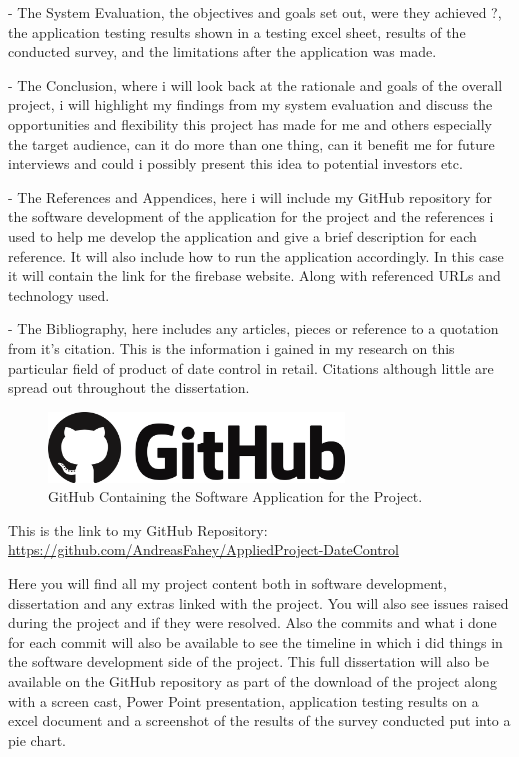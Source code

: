 - The System Evaluation, the objectives and goals set out, were they achieved ?, the application testing results shown in a testing excel sheet, results of the conducted survey, and the limitations after the application was made.
\newline

- The Conclusion, where i will look back at the rationale and goals of the overall project, i will highlight my findings from my system evaluation and discuss the opportunities and flexibility this project has made for me and others especially the target audience, can it do more than one thing, can it benefit me for future interviews and could i possibly present this idea to potential investors etc.
\newline

- The References and Appendices, here i will include my GitHub repository for the software development of the application for the project and the references i used to help me develop the application and give a brief description for each reference. It will also include how to run the application accordingly. In this case it will contain the link for the firebase website. Along with referenced URLs and technology used.
\newline

- The Bibliography, here includes any articles, pieces or reference to a quotation from it's citation. This is the information i gained in my research on this particular field of product of date control in retail. Citations although little are spread out throughout the dissertation.

\begin{figure}[h!]
	\caption{GitHub Containing the Software Application for the Project.}
	\label{image:github}
	\centering
	\includegraphics[width=0.7\textwidth]{images/github.png}
\end{figure}

This is the link to my GitHub Repository:
\newline
\url{https://github.com/AndreasFahey/AppliedProject-DateControl}
\newline

Here you will find all my project content both in software development, dissertation and any extras linked with the project.
You will also see issues raised during the project and if they were resolved. Also the commits and what i done for each commit will also be available to see the timeline in which i did things in the software development side of the project. This full dissertation will also be available on the GitHub repository as part of the download of the project along with a screen cast, Power Point presentation, application testing results on a excel document and a screenshot of the results of the survey conducted put into a pie chart. 



